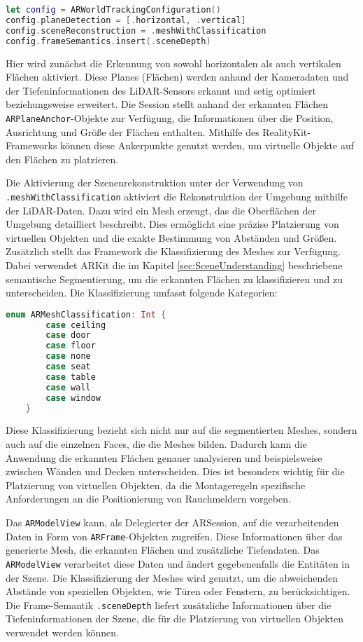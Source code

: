 \begin{lstlisting}[language=Swift]
let config = ARWorldTrackingConfiguration()
config.planeDetection = [.horizontal, .vertical]
config.sceneReconstruction = .meshWithClassification
config.frameSemantics.insert(.sceneDepth)
\end{lstlisting}

Hier wird zunächst die Erkennung von sowohl horizontalen als auch vertikalen Flächen aktiviert. Diese Planes (Flächen) werden anhand der Kameradaten und der Tiefeninformationen des LiDAR-Sensors erkannt und setig optimiert beziehungsweise erweitert. Die Session stellt anhand der erkannten Flächen \texttt{ARPlaneAnchor}-Objekte zur Verfügung, die Informationen über die Position, Ausrichtung und Größe der Flächen enthalten. Mithilfe des RealityKit-Frameworks können diese Ankerpunkte genutzt werden, um virtuelle Objekte auf den Flächen zu platzieren.

Die Aktivierung der Szenenrekonstruktion unter der Verwendung von \texttt{.meshWithClassification} aktiviert die Rekonstruktion der Umgebung mithilfe der LiDAR-Daten. Dazu wird ein Mesh erzeugt, das die Oberflächen der Umgebung detailliert beschreibt. Dies ermöglicht eine präzise Platzierung von virtuellen Objekten und die exakte Bestimmung von Abständen und Größen. Zusätzlich stellt das Framework die Klassifizierung des Meshes zur Verfügung. Dabei verwendet ARKit die im Kapitel \ref{sec:SceneUnderstanding} beschriebene semantische Segmentierung, um die erkannten Flächen zu klassifizieren und zu unterscheiden. Die Klassifizierung umfasst folgende Kategorien:

\begin{lstlisting}[language=Swift]
    enum ARMeshClassification: Int {
        case ceiling
        case door
        case floor
        case none
        case seat
        case table  
        case wall
        case window
    }
\end{lstlisting}

Diese Klassifizierung bezieht sich nicht nur auf die segmentierten Meshes, sondern auch auf die einzelnen Faces, die die Meshes bilden. Dadurch kann die Anwendung die erkannten Flächen genauer analysieren und beispielsweise zwischen Wänden und Decken unterscheiden. Dies ist besonders wichtig für die Platzierung von virtuellen Objekten, da die Montageregeln spezifische Anforderungen an die Positionierung von Rauchmeldern vorgeben.

Das \texttt{ARModelView} kann, als Delegierter der ARSession, auf die verarbeitenden Daten in Form von \texttt{ARFrame}-Objekten zugreifen. Diese Informationen über das generierte Mesh, die erkannten Flächen und zusätzliche Tiefendaten. Das \texttt{ARModelView} verarbeitet diese Daten und ändert gegebenenfalls die Entitäten in der Szene. Die Klassifizierung der Meshes wird genutzt, um die abweichenden Abstände von speziellen Objekten, wie Türen oder Fenstern, zu berücksichtigen. Die Frame-Semantik \texttt{.sceneDepth} liefert zusätzliche Informationen über die Tiefeninformationen der Szene, die für die Platzierung von virtuellen Objekten verwendet werden können.

